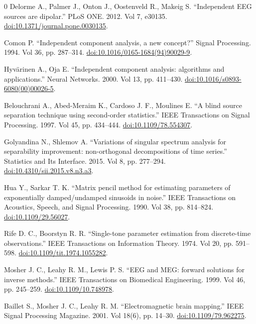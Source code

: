 \documentclass{article}
\begin{document}
\begin{thebibliography}{0}
 Delorme A., Palmer J., Onton J., Oostenveld R., Makeig S. ``Independent EEG sources are dipolar.'' PLoS ONE. 2012. Vol 7, e30135. \href{https://doi.org/10.1371/journal.pone.0030135}{doi:10.1371/journal.pone.0030135}.

 Comon P. ``Independent component analysis, a new concept?'' Signal Processing. 1994. Vol 36, pp. 287--314. \href{https://doi.org/10.1016/0165-1684(94)90029-9}{doi:10.1016/0165-1684(94)90029-9}.

 Hyv\"arinen A., Oja E. ``Independent component analysis: algorithms and applications.'' Neural Networks. 2000. Vol 13, pp. 411--430. \href{https://doi.org/10.1016/s0893-6080(00)00026-5}{doi:10.1016/s0893-6080(00)00026-5}.

 Belouchrani A., Abed-Meraim K., Cardoso J. F., Moulines E. ``A blind source separation technique using second-order statistics.'' IEEE Transactions on Signal Processing. 1997. Vol 45, pp. 434--444. \href{https://doi.org/10.1109/78.554307}{doi:10.1109/78.554307}.

 Golyandina N., Shlemov A. ``Variations of singular spectrum analysis for separability improvement: non-orthogonal decompositions of time series.'' Statistics and Its Interface. 2015. Vol 8, pp. 277--294. \href{https://doi.org/10.4310/sii.2015.v8.n3.a3}{doi:10.4310/sii.2015.v8.n3.a3}.

 Hua Y., Sarkar T. K. ``Matrix pencil method for estimating parameters of exponentially damped/undamped sinusoids in noise.'' IEEE Transactions on Acoustics, Speech, and Signal Processing. 1990. Vol 38, pp. 814--824. \href{https://doi.org/10.1109/29.56027}{doi:10.1109/29.56027}.

 Rife D. C., Boorstyn R. R. ``Single-tone parameter estimation from discrete-time observations.'' IEEE Transactions on Information Theory. 1974. Vol 20, pp. 591--598. \href{https://doi.org/10.1109/tit.1974.1055282}{doi:10.1109/tit.1974.1055282}.

 Mosher J. C., Leahy R. M., Lewis P. S. ``EEG and MEG: forward solutions for inverse methods.'' IEEE Transactions on Biomedical Engineering. 1999. Vol 46, pp. 245--259. \href{https://doi.org/10.1109/10.748978}{doi:10.1109/10.748978}.

 Baillet S., Mosher J. C., Leahy R. M. ``Electromagnetic brain mapping.'' IEEE Signal Processing Magazine. 2001. Vol 18(6), pp. 14--30. \href{https://doi.org/10.1109/79.962275}{doi:10.1109/79.962275}.


\end{thebibliography}
\end{document}
